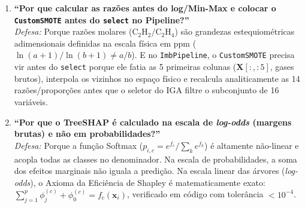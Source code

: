 \documentclass[10pt,a4paper]{article}
\begin{document}
\begin{defensecard}
\begin{enumerate}[leftmargin=0.5cm, itemsep=3pt]
  \item \textbf{``Por que calcular as razões antes do log/Min-Max e colocar o \texttt{CustomSMOTE} antes do \texttt{select} no Pipeline?''}\\
  \textit{Defesa:} Porque razões molares ($\text{C}_2\text{H}_2/\text{C}_2\text{H}_4$) são grandezas estequiométricas adimensionais definidas na escala física em ppm ($\ln(a+1)/\ln(b+1) \neq a/b$). E no \texttt{ImbPipeline}, o \texttt{CustomSMOTE} precisa vir antes do \texttt{select} porque ele fatia as 5 primeiras colunas ($\mathbf{X}[:, :5]$, gases brutos), interpola os vizinhos no espaço físico e recalcula analiticamente as 14 razões/proporções antes que o seletor do IGA filtre o subconjunto de 16 variáveis.

  \item \textbf{``Por que o TreeSHAP é calculado na escala de \textit{log-odds} (margens brutas) e não em probabilidades?''}\\
  \textit{Defesa:} Porque a função Softmax ($p_{i,c} = e^{f_c} / \sum_k e^{f_k}$) é altamente não-linear e acopla todas as classes no denominador. Na escala de probabilidades, a soma dos efeitos marginais não iguala a predição. Na escala linear das árvores (\textit{log-odds}), o Axioma da Eficiência de Shapley é matematicamente exato: $\sum_{j=1}^p \phi_j^{(c)} + \phi_0^{(c)} = f_c(\mathbf{x}_i)$, verificado em código com tolerância $< 10^{-4}$.
\end{enumerate}
\end{defensecard}
\end{document}
